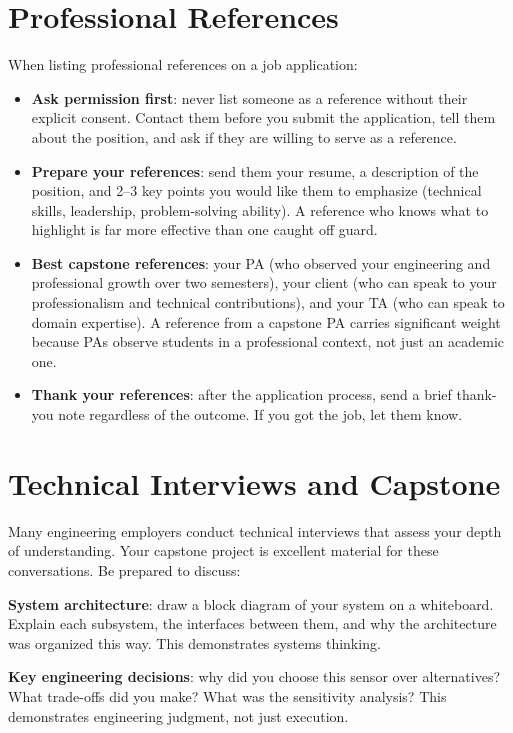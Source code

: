 \section{Professional References}
When listing professional references on a job application:

\begin{itemize}[nosep,leftmargin=1.5em]
\item \textbf{Ask permission first}: never list someone as a reference without their explicit consent. Contact them before you submit the application, tell them about the position, and ask if they are willing to serve as a reference.
\item \textbf{Prepare your references}: send them your resume, a description of the position, and 2--3 key points you would like them to emphasize (technical skills, leadership, problem-solving ability). A reference who knows what to highlight is far more effective than one caught off guard.
\item \textbf{Best capstone references}: your PA (who observed your engineering and professional growth over two semesters), your client (who can speak to your professionalism and technical contributions), and your TA (who can speak to domain expertise). A reference from a capstone PA carries significant weight because PAs observe students in a professional context, not just an academic one.
\item \textbf{Thank your references}: after the application process, send a brief thank-you note regardless of the outcome. If you got the job, let them know.
\end{itemize}

\section{Technical Interviews and Capstone}
Many engineering employers conduct technical interviews that assess your depth of understanding. Your capstone project is excellent material for these conversations. Be prepared to discuss:

\textbf{System architecture}: draw a block diagram of your system on a whiteboard. Explain each subsystem, the interfaces between them, and why the architecture was organized this way. This demonstrates systems thinking.

\textbf{Key engineering decisions}: why did you choose this sensor over alternatives? What trade-offs did you make? What was the sensitivity analysis? This demonstrates engineering judgment, not just execution.

